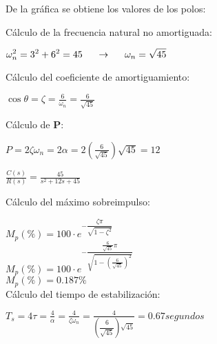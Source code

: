 \documentclass[12pt]{article}
\begin{document}
\begin{enumerate}
      De la gr\'afica se obtiene los valores de los polos:

      C\'alculo de la frecuencia natural no amortiguada:

      \( \displaystyle \omega_n^{2}= 3^2 + 6^2 = 45 \hspace{5mm} \rightarrow \hspace{5mm} \omega_{n}=\sqrt{45} \)

      C\'alculo del coeficiente de amortiguamiento:

      \( \displaystyle \cos{\theta} = \zeta = \frac{6}{\omega_{n}} = \frac{6}{\sqrt{45}} \)

      C\'alculo de \textbf{P}:

      \( \displaystyle P = 2\zeta \omega_{n} = 2 \alpha =
      2 \left ( \frac{6}{\sqrt{45}} \right)\sqrt{45} = 12 \)

      \vspace{1cm}


    \vspace{1cm}


    \( \displaystyle \frac{C(s)}{R(s)} = \frac{45}{s^2 + 12s + 45} \)

    \vspace{1cm}
    C\'alculo del m\'aximo sobreimpulso:

    \( \displaystyle M_p(\%) = 100\cdot e^{- \dfrac{\zeta \pi}{\sqrt{1 - \zeta^{2}}}} \)\\
    \( \displaystyle M_p(\%) = 100\cdot e^{- \dfrac{\tfrac{6}{\sqrt{45}} \pi}{\sqrt{1 - \left ( \tfrac{6}{\sqrt{45}} \right )^{2}}}} \)\\
    \( \displaystyle M_p(\%) = 0.187 \% \)\\

    C\'alculo del tiempo de estabilizaci\'on:

    \( \displaystyle T_{s} = 4 \tau = \frac{4}{\alpha} =
    \frac{4}{\zeta \omega_{n}} = \frac{4}{\left( \dfrac{6}{\sqrt{45}}\right) \sqrt{45}} = 0.67 segundos \)



\end{enumerate}
\end{document}
